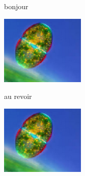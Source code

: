 \documentclass[french,onlymath]{beamer}
\begin{document}
\begin{frame}
\begin{minipage}{0.45\linewidth}
bonjour

\includegraphics[width=0.3\textwidth]{fig1}
\end{minipage}
\hspace{0.05\linewidth}
\begin{minipage}{0.45\linewidth}
au revoir

\hyperlink{départ}{}

\href{run:geogebra.ggb}{}

\includegraphics[width=0.3\textwidth]{fig1}
\end{minipage}
\end{frame}

\end{document}
